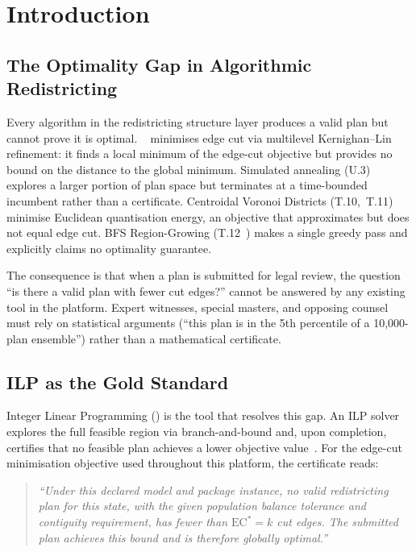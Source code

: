 \section{Introduction}
\label{sec:introduction}

\subsection{The Optimality Gap in Algorithmic Redistricting}

Every algorithm in the redistricting structure layer produces a valid plan
but cannot prove it is optimal.
\metis{}~\citep{karypis1998} minimises edge cut via multilevel
Kernighan--Lin refinement: it finds a local minimum of the edge-cut objective
but provides no bound on the distance to the global minimum.
Simulated annealing (U.3) explores a larger portion of plan space but
terminates at a time-bounded incumbent rather than a certificate.
Centroidal Voronoi Districts (T.10,~T.11) minimise Euclidean quantisation
energy, an objective that approximates but does not equal edge cut.
BFS Region-Growing (T.12~\citep{dellaLibera2026bfsgrowth}) makes a single
greedy pass and explicitly claims no optimality guarantee.

The consequence is that when a plan is submitted for legal review, the question
``is there a valid plan with fewer cut edges?'' cannot be answered by any
existing tool in the platform.
Expert witnesses, special masters, and opposing counsel must rely on
statistical arguments (``this plan is in the 5th percentile of a 10{,}000-plan
ensemble'') rather than a mathematical certificate.

\subsection{ILP as the Gold Standard}

Integer Linear Programming (\ilp{}) is the tool that resolves this gap.
An ILP solver explores the full feasible region via branch-and-bound
and, upon completion, certifies that no feasible plan achieves a lower
objective value~\citep{nemhauser1988}.
For the edge-cut minimisation objective used throughout this platform,
the certificate reads:

\begin{quote}
\textit{``Under this declared model and package instance, no valid
redistricting plan for this state, with the given
population balance tolerance and contiguity requirement, has fewer
than $\mathrm{EC}^* = k$ cut edges. The submitted plan achieves this
bound and is therefore globally optimal.''}
\end{quote}

